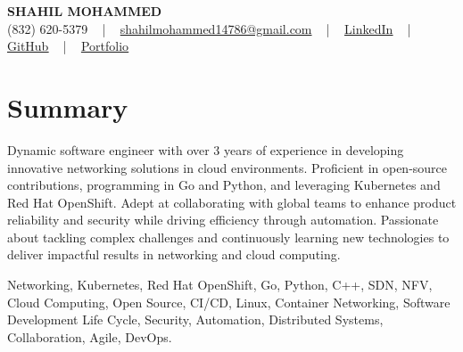 \documentclass[letterpaper,10pt]{article}
\begin{document}
\begin{center}
    {\fontsize{14pt}{12pt}\selectfont \textbf{\MakeUppercase{Shahil Mohammed}}}\\ \vspace{2pt}
    \fontsize{10pt}{12pt}\selectfont (832) 620-5379 ~ | ~ \href{mailto:shahilmohammed14786@gmail.com}{shahilmohammed14786@gmail.com} ~ | ~  
    \href{https://www.linkedin.com/in/shahil-mohammed-9652931a1/}{\color{blue}\underline{LinkedIn}}  ~ | ~ 
    \href{https://github.com/freakbeast14}{\color{blue}\underline{GitHub}} ~ | ~ 
    \href{https://shahil-mohammed.netlify.app/}{\color{blue}\underline{Portfolio}}
    \vspace{-8pt}
\end{center}

\section{Summary}
\vspace{-2pt}\fontsize{8pt}{9pt}\selectfont
Dynamic software engineer with over 3 years of experience in developing innovative networking solutions in cloud environments. Proficient in open-source contributions, programming in Go and Python, and leveraging Kubernetes and Red Hat OpenShift. Adept at collaborating with global teams to enhance product reliability and security while driving efficiency through automation. Passionate about tackling complex challenges and continuously learning new technologies to deliver impactful results in networking and cloud computing.
\vspace{-5pt}
 
{\fontsize{1pt}{1pt}\selectfont\color{white}
Networking, Kubernetes, Red Hat OpenShift, Go, Python, C++, SDN, NFV, Cloud Computing, Open Source, CI/CD, Linux, Container Networking, Software Development Life Cycle, Security, Automation, Distributed Systems, Collaboration, Agile, DevOps.
}
\vspace{-8pt}

\vspace{-2pt}
\end{document}
